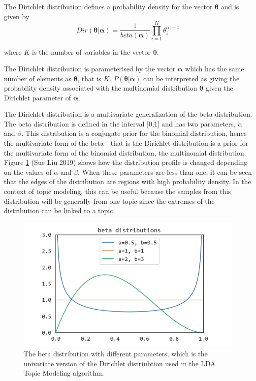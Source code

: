 \documentclass[
]{article}
\begin{document}
The Dirichlet distribution defines a probability density for the vector
\(\boldsymbol{\mathbf{\theta}}\) and is given by \begin{equation}
Dir(\boldsymbol{\mathbf{\theta}}| \boldsymbol{\alpha})= \frac{1}{beta(\boldsymbol{\alpha})}\prod_{i=1}^{K}\theta_i^{\alpha_i -1}
\end{equation}

where \(K\) is the number of variables in the vector
\(\boldsymbol{\mathbf{\theta}}\).

The Dirichlet distribution is parameterised by the vector
\(\boldsymbol{\alpha}\) which has the same number of elements as
\(\boldsymbol{\mathbf{\theta}}\), that is \(K\).
\(P(\boldsymbol{\mathbf{\theta}}|\boldsymbol{\alpha})\) can be
interpreted as giving the probability density associated with the
multinomial distribution \(\boldsymbol{\mathbf{\theta}}\) given the
Dirichlet parameter of \(\boldsymbol{\alpha}\).

The Dirichlet distribution is a multivariate generalization of the beta
distribution. The beta distribution is defined in the interval {[}0,1{]}
and has two parameters, \(\alpha\) and \(\beta\). This distribution is a
conjugate prior for the binomial distribution, hence the multivariate
form of the beta - that is the Dirichlet distribution is a prior for the
multivariate form of the binomial distribution, the multinomial
distribution. Figure \ref{fig:betadist} (Sue Liu 2019) shows how the
distribution profile is changed depending on the values of \(\alpha\)
and \(\beta\). When these parameters are less than one, it can be seen
that the edges of the distribution are regions with high probability
density. In the context of topic modeling, this can be useful because
the samples from this distribution will be generally from one topic
since the extremes of the distribution can be linked to a topic.

\begin{figure}

{\centering \includegraphics[width=1\linewidth]{images/Beta distribution} 

}

\caption{The beta distribution with different parameters, which is the univariate version of the Dirichlet distriubtion used in the LDA Topic Modeling algorithm.}\label{fig:betadist}
\end{figure}
\end{document}
